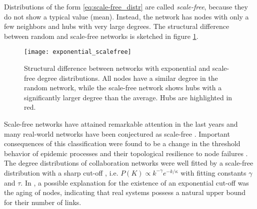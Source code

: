\documentclass[openright,twoside,headsepline]{scrbook}
\begin{document}
Distributions of the form \eqref{eq:scale-free_distr} are called \emph{scale-free}, because they do not show a typical value (mean).
Instead, the network has nodes with only a few neighbors and hubs with very large degrees.
The structural difference between random and scale-free networks is sketched in figure \ref{fig:random_scalefree}.
%
\begin{figure}[htbp]
\begin{center}
\texttt{[image: exponential\_scalefree]}
\caption{Structural difference between networks with exponential and scale-free degree distributions.
All nodes have a similar degree in the random network, while the scale-free network shows hubs with a significantly larger degree than the average.
Hubs are highlighted in red.}
\label{fig:random_scalefree}
\end{center}
\end{figure}

Scale-free networks have attained remarkable attention in the last years and many real-world networks have been conjectured as scale-free \citep{Newman2003,Barabasi99}.
Important consequences of this classification were found to be a change in the threshold behavior of epidemic processes \citep{Pastor-Satorras_vespi:2001} and their topological resilience to node failures \citep{Albert:2000}.
The degree distributions of collaboration networks were well fitted by a scale-free distribution with a sharp cut-off \citep{Newman:2001p,Albert:2000}, i.e. $P(K)\propto k^{-\gamma }e^{-k/\kappa }$ with fitting constants $\gamma $ and $\tau $.
In \citep{Amaral:2000}, a possible explanation for the existence of an exponential cut-off was the aging of nodes, indicating that real systems possess a natural upper bound for their number of links.
\end{document}

